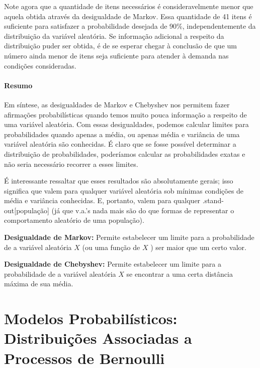 \documentclass[
]{book}
\theoremstyle{definition}
\theoremstyle{definition}
\theoremstyle{definition}
\theoremstyle{remark}
\begin{document}
Note agora que a quantidade de itens necessários é consideravelmente menor que aquela obtida através da desigualdade de Markov. Essa quantidade de 41 itens é suficiente para satisfazer a probabilidade desejada de 90\%, independentemente da distribuição da variável aleatória. Se informação adicional a respeito da distribuição puder ser obtida, é de se esperar chegar à conclusão de que um número ainda menor de itens seja suficiente para atender à demanda nas condições consideradas.

\hypertarget{resumo-1}{%
\subsubsection*{Resumo}\label{resumo-1}}

Em síntese, as desigualdades de Markov e Chebyshev nos permitem fazer afirmações probabilísticas quando temos muito pouca informação a respeito de uma variável aleatória. Com essas desigualdades, podemos calcular limites para probabilidades quando apenas a média, ou apenas média e variância de uma variável aleatória são conhecidas. É claro que se fosse possível determinar a distribuição de probabilidades, poderíamos calcular as probabilidades exatas e não seria necessário recorrer a esses limites.

É interessante ressaltar que esses resultados são absolutamente gerais; isso significa que valem para qualquer variável aleatória sob mínimas condições de média e variância conhecidas. E, portanto, valem para qualquer .stand-out{[}população{]} (já que v.a.'s nada mais são do que formas de representar o comportamento aleatório de uma população).

\textbf{Desigualdade de Markov:} Permite estabelecer um limite para a probabilidade de a variável aleatória \(X\) (ou uma função de \(X\) ) ser maior que um certo valor.

\textbf{Desigualdade de Chebyshev:} Permite estabelecer um limite para a probabilidade de a variável aleatória \(X\) se encontrar a uma certa distância máxima de sua média.

\hypertarget{modelos-probabiluxedsticos-distribuiuxe7uxf5es-associadas-a-processos-de-bernoulli}{%
\chapter{Modelos Probabilísticos: Distribuições Associadas a Processos de Bernoulli}\label{modelos-probabiluxedsticos-distribuiuxe7uxf5es-associadas-a-processos-de-bernoulli}}
\end{document}
